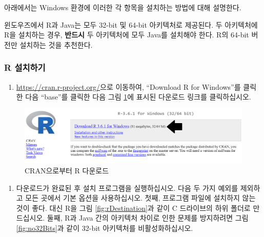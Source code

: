 \documentclass[11pt]{book}
\providecommand{\tightlist}{%
  \setlength{\itemsep}{0pt}\setlength{\parskip}{0pt}}
\theoremstyle{definition}
\theoremstyle{definition}
\theoremstyle{definition}
\theoremstyle{remark}
\let\BeginKnitrBlock\begin \let\EndKnitrBlock\end
\begin{document}
아래에서는 Windows 환경에 이러한 각 항목을 설치하는 방법에 대해
설명한다.

\BeginKnitrBlock{rmdimportant}
윈도우즈에서 R과 Java는 모두 32-bit 및 64-bit 아키텍처로 제공된다. 두
아키텍처에 R을 설치하는 경우, \textbf{반드시} 두 아키텍처에 모두 Java를
설치해야 한다. R의 64-bit 버전만 설치하는 것을 추천한다.
\EndKnitrBlock{rmdimportant}

\subsubsection*{R 설치하기}\label{r-}

\begin{enumerate}
\def\labelenumi{\arabic{enumi}.}
\tightlist
\item
  \url{https://cran.r-project.org/}으로 이동하여, ``Download R for
  Windows''를 클릭한 다음 ``base''를 클릭한 다음 그림
  \ref{fig:downloadR}에 표시된 다운로드 링크를 클릭하십시오.
\end{enumerate}

\begin{figure}

{\centering \includegraphics[width=1\linewidth]{images/OhdsiAnalyticsTools/downloadR} 

}

\caption{CRAN으로부터 R 다운로드}\label{fig:downloadR}
\end{figure}

\begin{enumerate}
\def\labelenumi{\arabic{enumi}.}
\setcounter{enumi}{1}
\tightlist
\item
  다운로드가 완료된 후 설치 프로그램을 실행하십시오. 다음 두 가지 예외를
  제외하고 모든 곳에서 기본 옵션을 사용하십시오. 첫째, 프로그램 파일에
  설치하지 않는 것이 좋다. 대신 R을 그림 \ref{fig:rDestination}과 같이 C
  드라이브의 하위 폴더로 만드십시오. 둘째, R과 Java 간의 아키텍처 차이로
  인한 문제를 방지하려면 그림 \ref{fig:no32Bits}과 같이 32-bit
  아키텍처를 비활성화하십시오.
\end{enumerate}
\end{document}
